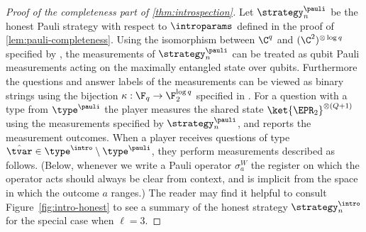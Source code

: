 \begin{proof}[Proof of the completeness part of \cref{thm:introspection}]
  Let $\strategy^\pauli_n$ be the honest Pauli strategy with respect to
  $\introparams$ defined in the proof of \cref{lem:pauli-completeness}. Using the 
  isomorphism between $\C^q$ and $(\C^2)^{\otimes \log q}$ specified by ,
 the measurements   of $\strategy^\pauli_n$ can be treated as qubit Pauli measurements acting on the
  maximally entangled state over qubits. Furthermore the questions and answer labels
  of the measurements can be viewed as binary strings
 using the bijection $\kappa: \F_q \to \F_2^{\log q}$ specified in .
  For a question with a type from $\type^\pauli$ the player measures the shared state
  $\ket{\EPR_2}^{\otimes (Q+1)}$ using the measurements specified by
  $\strategy^\pauli_n$, and reports the measurement outcomes.
  When a player receives questions of type $\hat{\tvar} \in \type^\intro
  \setminus \type^\pauli$, they perform measurements described as follows.
  (Below, whenever we write a Pauli operator $\sigma^W_a$ the register on which
  the operator acts should always be clear from context, and is implicit from
  the space in which the outcome $a$ ranges.)
  The reader may find it helpful to consult Figure~\ref{fig:intro-honest} to see
  a summary of the honest strategy $\strategy^\intro_n$ for the special case
  when $\ell = 3$.


\end{proof}
